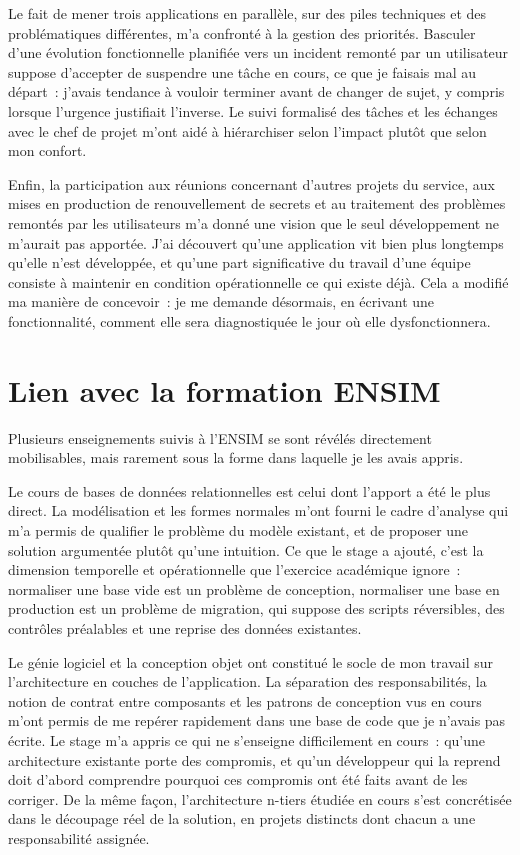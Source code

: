 Le fait de mener trois applications en parallèle, sur des piles techniques et
des problématiques différentes, m'a confronté à la gestion des priorités.
Basculer d'une évolution fonctionnelle planifiée vers un incident remonté par un
utilisateur suppose d'accepter de suspendre une tâche en cours, ce que je
faisais mal au départ~: j'avais tendance à vouloir terminer avant de changer de
sujet, y compris lorsque l'urgence justifiait l'inverse. Le suivi formalisé des
tâches et les échanges avec le chef de projet m'ont aidé à hiérarchiser selon
l'impact plutôt que selon mon confort.

Enfin, la participation aux réunions concernant d'autres projets du service, aux
mises en production de renouvellement de secrets et au traitement des problèmes
remontés par les utilisateurs m'a donné une vision que le seul développement ne
m'aurait pas apportée. J'ai découvert qu'une application vit bien plus longtemps
qu'elle n'est développée, et qu'une part significative du travail d'une équipe
consiste à maintenir en condition opérationnelle ce qui existe déjà. Cela a
modifié ma manière de concevoir~: je me demande désormais, en écrivant une
fonctionnalité, comment elle sera diagnostiquée le jour où elle
dysfonctionnera.

\section{Lien avec la formation ENSIM}
\label{sec:lien-ensim}

Plusieurs enseignements suivis à l'ENSIM se sont révélés directement
mobilisables, mais rarement sous la forme dans laquelle je les avais appris.

Le cours de bases de données relationnelles est celui dont l'apport a été le
plus direct. La modélisation et les formes normales m'ont fourni le cadre
d'analyse qui m'a permis de qualifier le problème du modèle existant, et de
proposer une solution argumentée plutôt qu'une intuition. Ce que le stage a
ajouté, c'est la dimension temporelle et opérationnelle que l'exercice
académique ignore~: normaliser une base vide est un problème de conception,
normaliser une base en production est un problème de migration, qui suppose des
scripts réversibles, des contrôles préalables et une reprise des données
existantes.

Le génie logiciel et la conception objet ont constitué le socle de mon travail
sur l'architecture en couches de l'application. La séparation des
responsabilités, la notion de contrat entre composants et les patrons de
conception vus en cours m'ont permis de me repérer rapidement dans une base de
code que je n'avais pas écrite. Le stage m'a appris ce qui ne s'enseigne
difficilement en cours~: qu'une architecture existante porte des compromis, et
qu'un développeur qui la reprend doit d'abord comprendre pourquoi ces compromis
ont été faits avant de les corriger. De la même façon, l'architecture n-tiers
étudiée en cours s'est concrétisée dans le découpage réel de la solution, en
projets distincts dont chacun a une responsabilité assignée.

